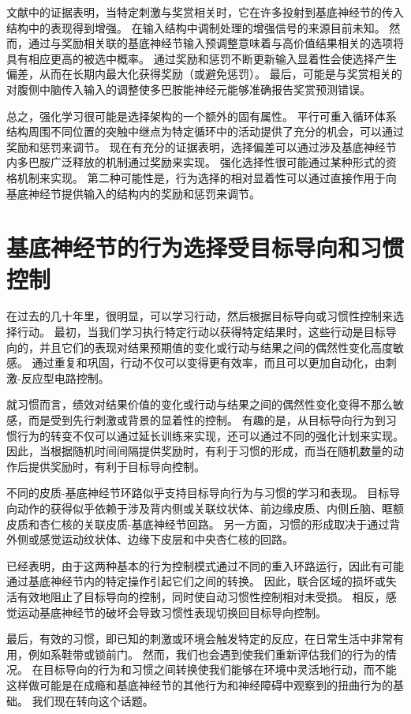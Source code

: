 文献中的证据表明，当特定刺激与奖赏相关时，它在许多投射到基底神经节的传入结构中的表现得到增强。 在输入结构中调制处理的增强信号的来源目前未知。 然而，通过与奖励相关联的基底神经节输入预调整意味着与高价值结果相关的选项将具有相应更高的被选中概率。 通过奖励和惩罚不断更新输入显着性会使选择产生偏差，从而在长期内最大化获得奖励（或避免惩罚）。 最后，可能是与奖赏相关的对腹侧中脑传入输入的调整使多巴胺能神经元能够准确报告奖赏预测错误。

总之，强化学习很可能是选择架构的一个额外的固有属性。 平行可重入循环体系结构周围不同位置的突触中继点为特定循环中的活动提供了充分的机会，可以通过奖励和惩罚来调节。 现在有充分的证据表明，选择偏差可以通过涉及基底神经节内多巴胺广泛释放的机制通过奖励来实现。 强化选择性很可能通过某种形式的资格机制来实现。 第二种可能性是，行为选择的相对显着性可以通过直接作用于向基底神经节提供输入的结构内的奖励和惩罚来调节。


\section{基底神经节的行为选择受目标导向和习惯控制}

在过去的几十年里，很明显，可以学习行动，然后根据目标导向或习惯性控制来选择行动。 最初，当我们学习执行特定行动以获得特定结果时，这些行动是目标导向的，并且它们的表现对结果预期值的变化或行动与结果之间的偶然性变化高度敏感。 通过重复和巩固，行动不仅可以变得更有效率，而且可以更加自动化，由刺激-反应型电路控制。

就习惯而言，绩效对结果价值的变化或行动与结果之间的偶然性变化变得不那么敏感，而是受到先行刺激或背景的显着性的控制。 有趣的是，从目标导向行为到习惯行为的转变不仅可以通过延长训练来实现，还可以通过不同的强化计划来实现。 因此，当根据随机时间间隔提供奖励时，有利于习惯的形成，而当在随机数量的动作后提供奖励时，有利于目标导向控制。

不同的皮质-基底神经节环路似乎支持目标导向行为与习惯的学习和表现。 目标导向动作的获得似乎依赖于涉及背内侧或关联纹状体、前边缘皮质、内侧丘脑、眶额皮质和杏仁核的关联皮质-基底神经节回路。 另一方面，习惯的形成取决于通过背外侧或感觉运动纹状体、边缘下皮层和中央杏仁核的回路。

已经表明，由于这两种基本的行为控制模式通过不同的重入环路运行，因此有可能通过基底神经节内的特定操作引起它们之间的转换。 因此，联合区域的损坏或失活有效地阻止了目标导向的控制，同时使自动习惯性控制相对未受损。 相反，感觉运动基底神经节的破坏会导致习惯性表现切换回目标导向控制。

最后，有效的习惯，即已知的刺激或环境会触发特定的反应，在日常生活中非常有用，例如系鞋带或锁前门。 然而，我们也会遇到使我们重新评估我们的行为的情况。 在目标导向的行为和习惯之间转换使我们能够在环境中灵活地行动，而不能这样做可能是在成瘾和基底神经节的其他行为和神经障碍中观察到的扭曲行为的基础。 我们现在转向这个话题。


